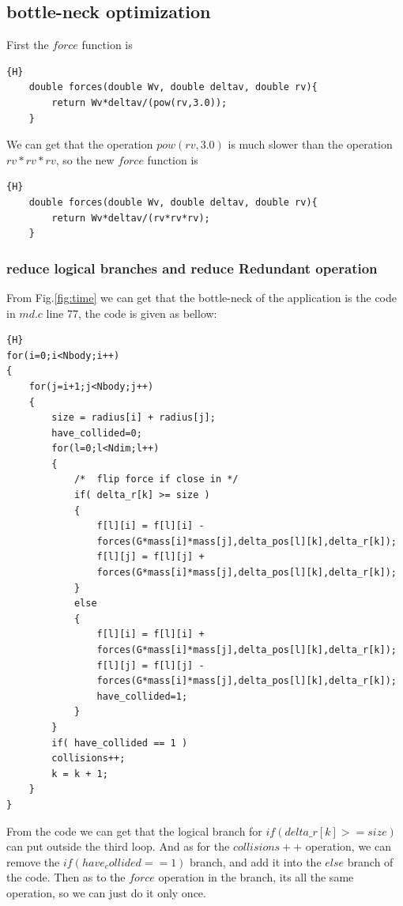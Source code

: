 \documentclass{article}
\begin{document}
\subsection{bottle-neck optimization}
\noindent First the  $force$ function is 
\begin{lstlisting}[caption={force function}]{H}
	double forces(double Wv, double deltav, double rv){
		return Wv*deltav/(pow(rv,3.0));
	}
\end{lstlisting}
We can get that the operation $pow(rv,3.0)$ is much slower than  the operation $rv*rv*rv$, so the new $force$ function is 
\begin{lstlisting}[caption={modified force function}]{H}
	double forces(double Wv, double deltav, double rv){
		return Wv*deltav/(rv*rv*rv);
	}
\end{lstlisting}
\subsubsection{reduce logical branches and reduce Redundant operation}
From Fig.\ref{fig:time} we can get that the bottle-neck of the application is the code in $md.c$ line 77, the code is given as bellow:
\begin{lstlisting}{H}
for(i=0;i<Nbody;i++)
{
	for(j=i+1;j<Nbody;j++)
	{
		size = radius[i] + radius[j];
		have_collided=0;
		for(l=0;l<Ndim;l++)
		{
			/*  flip force if close in */
			if( delta_r[k] >= size )
			{
				f[l][i] = f[l][i] -
				forces(G*mass[i]*mass[j],delta_pos[l][k],delta_r[k]);
				f[l][j] = f[l][j] + 
				forces(G*mass[i]*mass[j],delta_pos[l][k],delta_r[k]);
			}
			else
			{
				f[l][i] = f[l][i] + 
				forces(G*mass[i]*mass[j],delta_pos[l][k],delta_r[k]);
				f[l][j] = f[l][j] - 
				forces(G*mass[i]*mass[j],delta_pos[l][k],delta_r[k]);
				have_collided=1;
			}
		}
		if( have_collided == 1 )
		collisions++;
		k = k + 1;
	}
}
\end{lstlisting}
From the code we can get that the logical branch for $if(delta\_r[k]>=size)$ can put outside the third loop. And as for the $collisions++$ operation, we can remove the $if( have_collided == 1 )$ branch, and add it into the $else$ branch of the code. Then as to the $force$ operation in the branch, its all the same operation, so we can just do it only once.  
\end{document}
